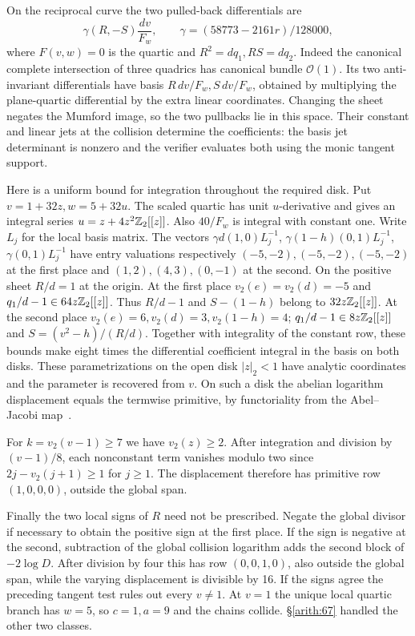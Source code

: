 On the reciprocal curve the two pulled-back differentials are
\[\gamma(R,-S)\frac{dv}{F_w},\qquad
 \gamma=(58773-2161r)/128000,\]
where \(F(v,w)=0\) is the quartic and \(R^2=d q_1, RS=d q_2\).
Indeed the canonical complete intersection of three quadrics has
canonical bundle \(\mathcal O(1)\). Its two anti-invariant
differentials have basis \(R\,dv/F_w,S\,dv/F_w\), obtained by
multiplying the plane-quartic differential by the extra linear
coordinates. Changing the sheet negates the Mumford image, so the
two pullbacks lie in this space. Their constant and linear jets at
the collision determine the coefficients: the basis jet determinant
is nonzero and the verifier evaluates both using the monic tangent
support.

Here is a uniform bound for integration throughout the required disk.
Put \(v=1+32z, w=5+32u\). The scaled quartic has unit \(u\)-derivative
and gives an integral series \(u=z+4z^2\mathbb Z_2[[z]]\).
Also \(40/F_w\) is integral with constant one. Write \(L_j\) for
the local basis matrix. The vectors \(\gamma d(1,0)L_j^{-1}\),
\(\gamma(1-h)(0,1)L_j^{-1}\), \(\gamma(0,1)L_j^{-1}\) have entry
valuations respectively \((-5,-2),(-5,-2),(-5,-2)\) at the first
place and \((1,2),(4,3),(0,-1)\) at the second. On the positive
sheet \(R/d=1\) at the origin. At the first place
\(v_2(e)=v_2(d)=-5\) and \(q_1/d-1\in64z\mathbb Z_2[[z]]\).
Thus \(R/d-1\) and \(S-(1-h)\) belong to \(32z\mathbb Z_2[[z]]\).
At the second place \(v_2(e)=6,v_2(d)=3,v_2(1-h)=4\);
\(q_1/d-1\in8z\mathbb Z_2[[z]]\) and \(S=(v^2-h)/(R/d)\).
Together with integrality of the constant row, these bounds make
eight times the differential coefficient integral in the basis on
both disks. These parametrizations on the open disk \(|z|_2<1\)
have analytic coordinates and the parameter is recovered from \(v\).
On such a disk the abelian logarithm displacement equals the
termwise primitive, by functoriality from the Abel--Jacobi map~\cite[\S7]{StollBounds}.

For \(k=v_2(v-1)\ge7\) we have \(v_2(z)\ge2\). After
integration and division by \((v-1)/8\), each nonconstant term vanishes
modulo two since \(2j-v_2(j+1)\ge1\) for \(j\ge1\). The displacement
therefore has primitive row \((1,0,0,0)\), outside the global span.

Finally the two local signs of \(R\) need not be prescribed. Negate
the global divisor if necessary to obtain the positive sign at the
first place. If the sign is negative at the second, subtraction of
the global collision logarithm adds the second block of \(-2\log D\).
After division by four this has row \((0,0,1,0)\), also outside the
global span, while the varying displacement is divisible by 16.
If the signs agree the preceding tangent test rules out every
\(v\ne1\). At \(v=1\) the unique local quartic branch has \(w=5\),
so \(c=1,a=9\) and the chains collide. \S\ref{arith:67} handled the
other two classes.

